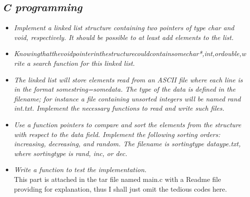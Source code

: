 \documentclass{article}
\begin{document}
\begin{spacing}{2.0}
\section{\textit{C programming}}
\begin{itemize}
	\item \textit{Implement a linked list structure containing two pointers of type char and void, respectively. It should be possible to at least add elements to the list.}\\
	\item \textit{Knowingthatthevoidpointerinthestructurecouldcontainsomechar*,int,ordouble,write a search function for this linked list.}\\
	\item \textit{The linked list will store elements read from an ASCII file where each line is in the format somestring=somedata. The type of the data is defined in the filename; for instance a file containing unsorted integers will be named rand int.txt. Implement the necessary functions to read and write such files.}\\
	\item \textit{Use a function pointers to compare and sort the elements from the structure with respect to the data field. Implement the following sorting orders: increasing, decreasing, and random. The filename is sortingtype dataype.txt, where sortingtype is rand, inc, or dec.}\\
	\item \textit{Write a function to test the implementation.}\\
	This part is attached in the tar file named main.c with a Readme file providing for explanation, thus I shall just omit the tedious codes here.
\end{itemize}
\end{spacing}
\end{document}

